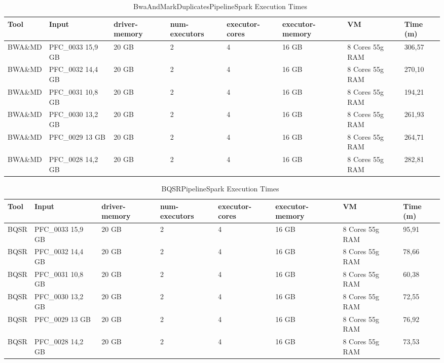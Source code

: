 \begin{table}[h]
	\caption{BwaAndMarkDuplicatesPipelineSpark Execution Times~\label{BWA_6_16}}
	\begin{center}
		\begin{tabular}{| m{5em} | m{5em} | m{3em} | m{4em} | m{4em} | m{5em} | m{4.5em} | m{3em} |}
    		\hline
    		Tool & Input & driver-memory & num-executors & executor-cores & executor-memory & VM & Time (m) \\ \hline
		    BWA\&MD & PFC\_0033 15,9 GB & 20 GB & 2 & 4 & 16 GB & 8 Cores 55g RAM & 306,57 \\ \hline
			BWA\&MD & PFC\_0032 14,4 GB & 20 GB & 2 & 4 & 16 GB & 8 Cores 55g RAM  & 270,10 \\ \hline
			BWA\&MD & PFC\_0031 10,8 GB & 20 GB & 2 & 4 & 16 GB & 8 Cores 55g RAM  & 194,21 \\ \hline
			BWA\&MD & PFC\_0030 13,2 GB& 20 GB & 2 & 4 & 16 GB & 8 Cores 55g RAM  & 261,93 \\ \hline
			BWA\&MD & PFC\_0029 13 GB & 20 GB & 2 & 4 & 16 GB & 8 Cores 55g RAM  & 264,71 \\ \hline
			BWA\&MD & PFC\_0028 14,2 GB & 20 GB & 2 & 4 & 16 GB & 8 Cores 55g RAM  & 282,81 \\ \hline
    	\end{tabular}
    \end{center}
\end{table}
\begin{table}[h]
	\caption{BQSRPipelineSpark Execution Times~\label{BQSR_6_16}}
	\begin{center}
		\begin{tabular}{| m{5em} | m{5em} | m{3em} | m{4em} | m{4em} | m{5em} | m{4.5em} | m{3em} |}
    		\hline
    		Tool & Input & driver-memory & num-executors & executor-cores & executor-memory & VM & Time (m) \\ \hline
		    BQSR & PFC\_0033 15,9 GB & 20 GB & 2 & 4 & 16 GB & 8 Cores 55g RAM & 95,91 \\ \hline
			BQSR & PFC\_0032 14,4 GB & 20 GB & 2 & 4 & 16 GB & 8 Cores 55g RAM  & 78,66 \\ \hline
			BQSR & PFC\_0031 10,8 GB & 20 GB & 2 & 4 & 16 GB & 8 Cores 55g RAM  & 60,38 \\ \hline
			BQSR & PFC\_0030 13,2 GB& 20 GB & 2 & 4 & 16 GB & 8 Cores 55g RAM  & 72,55 \\ \hline
			BQSR & PFC\_0029 13 GB & 20 GB & 2 & 4 & 16 GB & 8 Cores 55g RAM  & 76,92 \\ \hline
			BQSR & PFC\_0028 14,2 GB & 20 GB & 2 & 4 & 16 GB & 8 Cores 55g RAM  & 73,53 \\ \hline
    	\end{tabular}
    \end{center}
\end{table}
